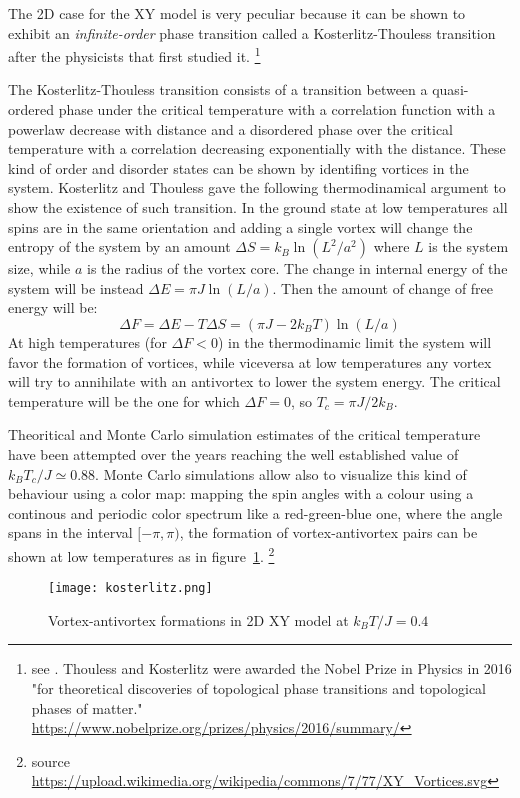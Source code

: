 The 2D case for the XY model is very peculiar because it can be shown to exhibit an
\emph{infinite-order} phase transition called a Kosterlitz-Thouless transition 
after the physicists that first studied it. \footnote{see 
\cite{Kosterlitz_1973}. Thouless and Kosterlitz were awarded the Nobel Prize in 
Physics in 2016 "for theoretical discoveries of topological phase transitions and 
topological phases of matter." 
\url{https://www.nobelprize.org/prizes/physics/2016/summary/}}

The Kosterlitz-Thouless transition consists of a transition between a quasi-ordered 
phase under the critical temperature with a correlation function with a powerlaw
decrease with distance and a disordered phase over the critical temperature with 
a correlation decreasing exponentially with the distance. These kind of order and
disorder states can be shown by identifing vortices in the system. Kosterlitz and 
Thouless gave the following thermodinamical argument to show the existence of such
transition. In the ground state at low temperatures all spins are in the same 
orientation and adding a single vortex will change the entropy of the system by
an amount $\Delta S = k_B \ln(L^2 / a^2)$ where $L$ is the system size, while $a$ 
is the radius of the vortex core. The change in internal energy of the system will
be instead $\Delta E = \pi J \ln(L/a)$. Then the amount of change of free energy will be:
$$ \Delta F = \Delta E - T \Delta S = (\pi J - 2 k_B T) \ln(L/a) $$
At high temperatures (for $\Delta F < 0$) in the thermodinamic limit the system 
will favor the formation of vortices, while viceversa at low temperatures
any vortex will try to annihilate with an antivortex to lower the system energy.
The critical temperature will be the one for which $\Delta F = 0$, so $T_c = \pi
J / 2 k_B$.

Theoritical and Monte Carlo simulation estimates of the critical temperature have
been attempted over the years reaching the well established value of $k_B T_c / J
\simeq 0.88$. Monte Carlo simulations allow also to visualize this kind of 
behaviour using a color map: mapping the spin angles with a colour using a 
continous and periodic color spectrum like a red-green-blue one, where the angle
spans in the interval $[-\pi, \pi)$, the formation of vortex-antivortex pairs can 
be shown at low temperatures as in figure~\ref{fig:kosterlitz}.
\footnote{source 
\url{https://upload.wikimedia.org/wikipedia/commons/7/77/XY_Vortices.svg}}

\begin{figure}[h]
\label{fig:kosterlitz}
\centering
\texttt{[image: kosterlitz.png]}
\caption{Vortex-antivortex formations in 2D XY model at $k_B T / J = 0.4$}
\end{figure}
 

